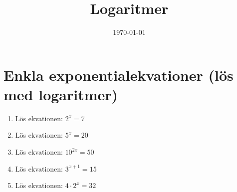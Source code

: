 \documentclass[a4paper,11pt]{article}
\title{Logaritmer}
\author{}
\date{\today}
\begin{document}
\maketitle


    
    
    
    
    
    
    

\section{Enkla exponentialekvationer (lös med logaritmer)}

\begin{enumerate}[label=\textbf{\arabic*.}]
    \item Lös ekvationen: $2^x = 7$
    
    \item Lös ekvationen: $5^x = 20$
    
    \item Lös ekvationen: $10^{2x} = 50$
    
    \item Lös ekvationen: $3^{x+1} = 15$
    
    \item Lös ekvationen: $4 \cdot 2^x = 32$
\end{enumerate}
\end{document}
